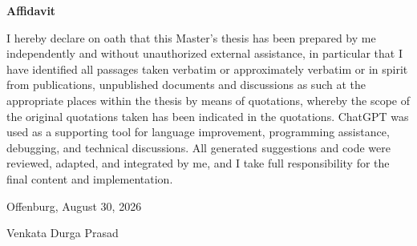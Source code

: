 \clearpage
\thispagestyle{empty}


{\LARGE\bfseries Affidavit\par}

\vspace{1.2cm}


 I hereby declare on oath that this Master’s thesis has been prepared by me independently and without unauthorized external assistance, in particular that I have identified all passages taken verbatim or approximately verbatim or in spirit from publications, unpublished documents and discussions as such at the appropriate places within the thesis by means of quotations, whereby the scope of the original quotations taken has been indicated in the quotations. ChatGPT was used as a supporting tool for language improvement, programming assistance, debugging, and technical discussions. All generated suggestions and code were reviewed, adapted, and integrated by me, and I take full responsibility for the final content and implementation. 

\vspace{1.5cm}

\noindent
Offenburg, August 30, 2026

\vspace{1.2cm}

\noindent

\vspace{0.4cm}

\noindent
Venkata Durga Prasad